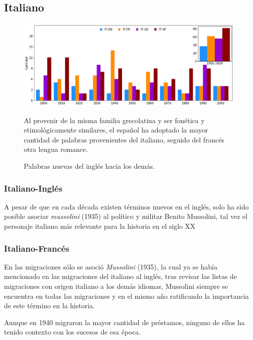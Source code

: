 \subsection{Italiano}%

\begin{figure}[h!]
	\centering
	\includegraphics[scale=.38]{Cap_3/NC_IT.png}
	\label{fig.NC_IT}
	\caption{Palabras nuevas del inglés hacia los demás.}
	\smallskip
	\small
	Al provenir de la misma familia grecolatina y ser fonética y etimológicamente similares, el español ha adoptado la mayor cantidad de palabras provenientes del italiano,  seguido del francés otra lengua romance.  
\end{figure}




\subsubsection*{Italiano-Inglés}%

A pesar de que en cada década existen términos nuevos en el inglés, solo ha sido posible asociar \textit{mussolini} (1935) al político y militar Benito Mussolini, tal vez el personaje italiano más relevante para la historia en el siglo XX 

\subsubsection*{Italiano-Francés}%



En las migraciones sólo se asoció \textit{Mussolini} (1935), la cual ya se había mencionado en las migraciones del italiano al inglés, tras revisar las listas de migraciones con origen italiano  a los demás idiomas, Mussolini siempre se encuentra en todas las migraciones y en el mismo año ratificando la importancia de este término en la historia. 

Aunque en 1940 migraron la mayor cantidad de préstamos, ninguno de ellos ha tenido contexto con los sucesos de esa época. 

